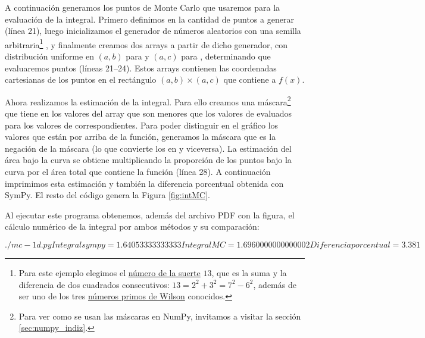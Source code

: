 A continuación generamos los puntos de Monte Carlo que usaremos para la evaluación de la integral. Primero definimos en  la cantidad de puntos a generar (línea 21), luego inicializamos el generador de números aleatorios con una semilla arbitraria\footnote{Para este ejemplo elegimos el \href{https://es.wikipedia.org/wiki/Número\_de\_la\_suerte}{número de la suerte} $13$, que es la suma y la diferencia de dos cuadrados consecutivos: $13 = 2^2 + 3^2 = 7^2 - 6^2$, además de ser uno de los tres \href{https://es.wikipedia.org/wiki/Número\_primo\_de\_Wilson}{números primos de Wilson} conocidos.} , y finalmente creamos dos arrays a partir de dicho generador, con distribución uniforme en $(a, b)$ para  y  $(a, c)$ para , determinando que evaluaremos  puntos (líneas 21--24). Estos arrays contienen las coordenadas cartesianas de los puntos en el rectángulo $(a, b) \times (a, c)$ que contiene a $f(x)$.

Ahora realizamos la estimación de la integral. Para ello creamos una máscara\footnote{Para ver como se usan las máscaras en NumPy, invitamos a visitar la sección \ref{sec:numpy_indiz}.} que tiene  en los valores del array  que son menores que los valores de  evaluados para los valores de  correspondientes. Para poder distinguir en el gráfico los valores que están por arriba de la función, generamos la máscara  que es la negación de la máscara  (lo que convierte los  en  y viceversa). La estimación del área bajo la curva se obtiene multiplicando la proporción de los puntos bajo la curva por el área total que contiene la función (línea 28). A continuación imprimimos esta estimación y también la diferencia porcentual obtenida con SymPy. El resto del código genera la Figura \ref{fig:intMC}.

Al ejecutar este programa obtenemos, además del archivo PDF con la figura, el cálculo numérico de la integral por ambos métodos y su comparación:
\begin{shell}
$ ./mc-1d.py 
Integral sympy = 1.64053333333333
   Integral MC = 1.6960000000000002
Diferencia porcentual = 3.381 %
$
\end{shell}

